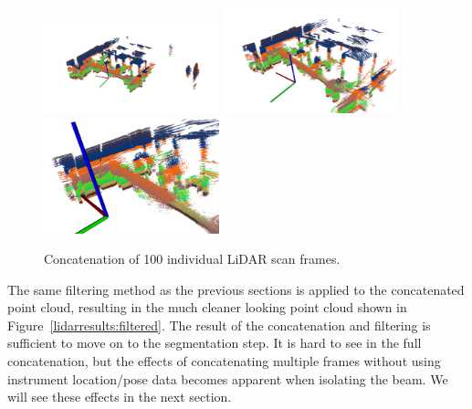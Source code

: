 \documentclass[12pt]{drexelthesis}
\begin{document}
\begin{figure}[!ht]
	\centering
		\includegraphics[width=2in]{images/real-lab-scans/rawscan0.png}
		\includegraphics[width=2in]{images/real-lab-scans/rawscan1.png}
		\includegraphics[width=2in]{images/real-lab-scans/rawscan2.png}
		\caption[Concatenation of 100 individual LiDAR scan frames]{\centering Concatenation of 100 individual LiDAR scan frames.}
	\label{lidarresults:concatenated}
\end{figure}

The same filtering method as the previous sections is applied to the concatenated point cloud, resulting in the much cleaner looking point cloud shown in Figure~\ref{lidarresults:filtered}. The result of the concatenation and filtering is sufficient to move on to the segmentation step. It is hard to see in the full concatenation, but the effects of concatenating multiple frames without using instrument location/pose data becomes apparent when isolating the beam. We will see these effects in the next section.
\end{document}
